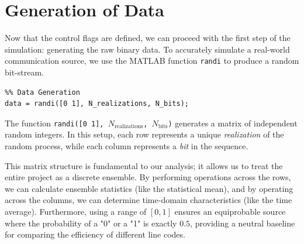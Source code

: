 \chapter[Generation of Data]{Generation of Data}
\label{cp:generation-of-data}

Now that the control flags are defined, we can proceed with the first step of
the simulation: generating the raw binary data. To accurately simulate a
real-world communication source, we use the MATLAB function \texttt{randi} to
produce a random bit-stream.

\begin{listing}[!htpb]
    \caption{Generation of Data.}
    \label{listing:Data-Generation}
    \begin{verbatim}
%% Data Generation
data = randi([0 1], N_realizations, N_bits);
    \end{verbatim}
\end{listing}

The function \texttt{randi([0 1], $N_{\text{realizations}}$,
    $N_{\text{bits}}$)} generates a matrix of independent random integers. In this
setup, each row represents a unique \textit{realization} of the random process,
while each column represents a \textit{bit} in the sequence.

This matrix structure is fundamental to our analysis; it allows us to treat the
entire project as a discrete ensemble. By performing operations across the
rows, we can calculate ensemble statistics (like the statistical mean), and by
operating across the columns, we can determine time-domain characteristics
(like the time average). Furthermore, using a range of $[0, 1]$ ensures an
equiprobable source where the probability of a "0" or a "1" is exactly $0.5$,
providing a neutral baseline for comparing the efficiency of different line
codes.

